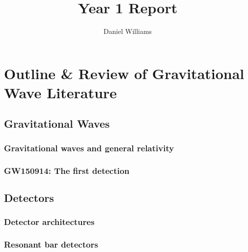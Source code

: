 \documentclass{kentigern}
\title{Year 1 Report}
\author{Daniel Williams}
\begin{document}
\maketitle

\newpage
%

\tableofcontents

\part{Outline \& Review of Gravitational Wave Literature}
\label{part:introduction}



\chapter{Gravitational Waves}
\label{cha:grav-waves}




\section{Gravitational waves and general relativity}
\label{sec:grav-waves-gener}


\section{GW150914: The first detection}
\label{sec:gw150914:-first-dete}



\chapter{Detectors}
\label{cha:detectors}




\section{Detector architectures}
\label{sec:detect-arch}

\section{Resonant bar detectors}
\label{sec:reson-bar-detect}
\end{document}
